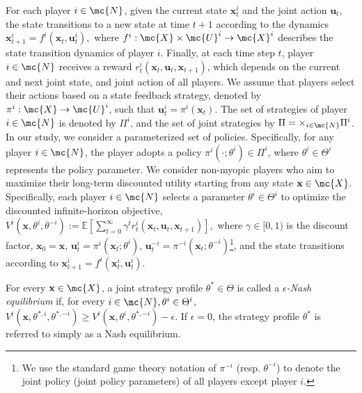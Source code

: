 For each player \(i \in \mc{N}\), given the current state \(\mathbf{x}_t^i\) and the joint action \(\mathbf{u}_t\), the state transitions to a new state at time \(t+1\) according to the dynamics \(\mathbf{x}_{t+1}^i = f^i(\mathbf{x}_t, \mathbf{u}_t^i),\)
where \(f^i: \mc{X} \times \mc{U}^i \to \mc{X}^i\) describes the state transition dynamics of player \(i\). 
Finally, at each time step \(t\), player \(i \in \mc{N}\) receives a reward \(r^i_t(\mathbf{x}_t, \mathbf{u}_t, \mathbf{x}_{t+1})\), which depends on the current and next joint state, and joint action of all players.
We assume that players select their actions based on a state feedback strategy, denoted by \(\pi^i: \mc{X} \to \mc{U}^i\), such that \(\mathbf{u}_t^i = \pi^i(\mathbf{x}_t)\).  The set of strategies of player \(i \in \mc{N}\) is denoted by \(\Pi^i\), and the set of joint strategies by \(\Pi = \times_{i\in\mc{N}} \Pi^i\).
In our study, we consider a parameterized set of policies. Specifically, for any player \(i \in \mc{N}\), the player adopts a policy \(\pi^i(\cdot;\theta^i) \in \Pi^i\), where \(\theta^i \in \Theta^i\) represents the policy parameter.
We consider non-myopic players who aim to maximize their long-term discounted utility starting from any state \(\mathbf{x} \in \mc{X}\). Specifically, each player \(i \in \mc{N}\) selects a parameter \(\theta^i \in \Theta^i\) to optimize the discounted infinite-horizon objective, 
\(
    V^i(\mathbf{x}, \theta^i, \theta^{-i}) := \mathbb{E}\left[ \sum_{t=0}^{\infty} \gamma^t r^i_t(\mathbf{x}_t, \mathbf{u}_t, \mathbf{x}_{t+1}) \right],
\)
where \(\gamma \in [0,1)\) is the discount factor, \(\mathbf{x}_0 = \mathbf{x}\), \(\mathbf{u}_t^i = \pi^i(\mathbf{x}_t; \theta^i)\), \(\mathbf{u}_t^{-i} = \pi^{-i}(\mathbf{x}_t; \theta^{-i})\)\footnote{We use the standard game theory notation of \(\pi^{-i}\) (resp. \(\theta^{-i}\)) to denote the joint policy (joint policy parameters) of all players except player \(i\).}, and the state transitions according to \(\mathbf{x}_{t+1}^i = f^i(\mathbf{x}_t^i, \mathbf{u}_t^i)\).

\begin{definition}\label{def: NE}
    For every \(\mathbf{x} \in \mc{X}\), a joint strategy profile \(\theta^\ast \in \Theta\) is called a \emph{\(\epsilon\)-Nash equilibrium} if, for every \(i \in \mc{N}, \theta^i\in \Theta^i\),
\(
    V^i(\mathbf{x}, \theta^{\ast,i}, \theta^{\ast, -i}) \geq V^i(\mathbf{x}, {\theta}^i, \theta^{\ast, -i}) - \epsilon. \)
If \(\epsilon = 0\), the strategy profile \(\theta^\ast\) is referred to simply as a Nash equilibrium. 
\end{definition}
